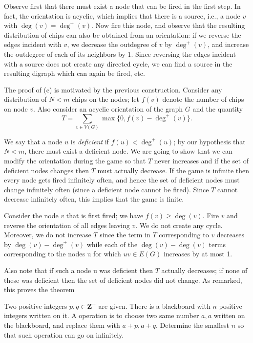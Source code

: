Observe first that there must exist a node that can be fired in the first step. In fact, the orientation is acyclic, which implies that there is a source, i.e., a node $v$ with $\deg(v) = \deg^+(v)$. Now fire this node, and observe that the resulting distribution of chips can also be obtained from an orientation: if we reverse the edges incident with $v$, we decrease the outdegree of $v$ by $\deg^+(v)$, and increase the outdegree of each of its neighbors by $1$. Since reversing the edges incident with a source does not create any directed cycle, we can find a source in the resulting digraph which can again be fired, etc.

The proof of (c) is motivated by the previous construction. Consider any distribution of $N < m$ chips on the nodes; let $f(v)$ denote the number of chips on node $v$. Also consider an acyclic orientation of the graph $G$ and the quantity \[T = \sum_{v \in V(G)}\max\{0, f(v) - \deg^+(v)\}.\]

We say that a node $u$ is \emph{deficient} if $f(u) < \deg^+(u)$; by our hypothesis that $N < m$, there must exist a deficient node. We are going to show that we can modify the orientation during the game so that $T$ never increases and if the set of deficient nodes changes then $T$ must actually decrease. If the game is infinite then every node gets fired infinitely often, and hence the set of deficient nodes must change infinitely often (since a deficient node cannot be fired). Since $T$ cannot decrease infinitely often, this implies that the game is finite.

Consider the node $v$ that is first fired; we have $f(v) \geq \deg(v)$. Fire $v$ and reverse the orientation of all edges leaving $v$. We do not create any cycle. Moreover, we do not increase $T$ since the term in $T$ corresponding to $v$ decreases by $\deg(v) - \deg^+(v)$ while each of the $\deg(v)-\deg(v)$ terms corresponding to the nodes u for which $uv \in E(G)$ increases by at most 1.

Also note that if such a node u was deficient then $T$ actually decreases; if none of these was deficient then the set of deficient nodes did not change. As remarked, this proves the theorem

\begin{example} 
Two positive integers $p,q \in \mathbf{Z}^{+}$ are given. There is a blackboard with $n$ positive integers written on it. A operation is to choose two same number $a,a$ written on the blackboard, and replace them with $a+p,a+q$. Determine the smallest $n$ so that such operation can go on infinitely.
\end{example}

